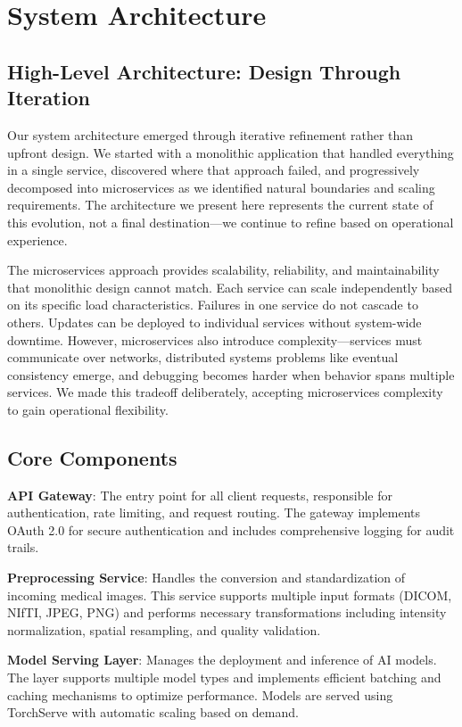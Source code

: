 \documentclass[12pt,a4paper]{article}
\begin{document}
\section{System Architecture}

\subsection{High-Level Architecture: Design Through Iteration}

Our system architecture emerged through iterative refinement rather than upfront design. We started with a monolithic application that handled everything in a single service, discovered where that approach failed, and progressively decomposed into microservices as we identified natural boundaries and scaling requirements. The architecture we present here represents the current state of this evolution, not a final destination—we continue to refine based on operational experience.

The microservices approach provides scalability, reliability, and maintainability that monolithic design cannot match. Each service can scale independently based on its specific load characteristics. Failures in one service do not cascade to others. Updates can be deployed to individual services without system-wide downtime. However, microservices also introduce complexity—services must communicate over networks, distributed systems problems like eventual consistency emerge, and debugging becomes harder when behavior spans multiple services. We made this tradeoff deliberately, accepting microservices complexity to gain operational flexibility.

\subsection{Core Components}

\textbf{API Gateway}: The entry point for all client requests, responsible for authentication, rate limiting, and request routing. The gateway implements OAuth 2.0 for secure authentication and includes comprehensive logging for audit trails.

\textbf{Preprocessing Service}: Handles the conversion and standardization of incoming medical images. This service supports multiple input formats (DICOM, NIfTI, JPEG, PNG) and performs necessary transformations including intensity normalization, spatial resampling, and quality validation.

\textbf{Model Serving Layer}: Manages the deployment and inference of AI models. The layer supports multiple model types and implements efficient batching and caching mechanisms to optimize performance. Models are served using TorchServe with automatic scaling based on demand.
\end{document}
